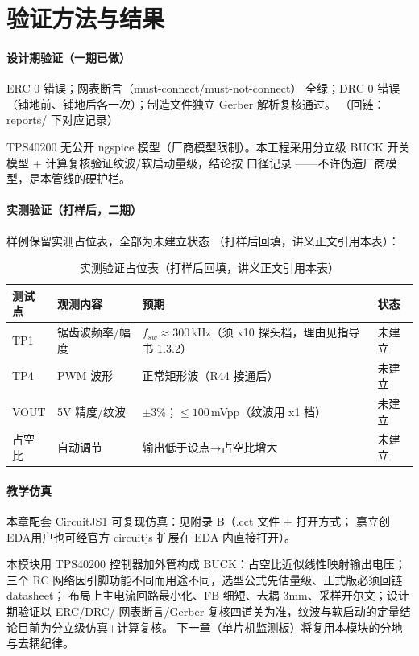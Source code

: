 \section{验证方法与结果}

\paragraph{设计期验证（一期已做）} ERC 0 错误；网表断言（must-connect/must-not-connect）
全绿；DRC 0 错误（铺地前、铺地后各一次）；制造文件独立 Gerber 解析复核通过。
（回链：reports/ 下对应记录）

\begin{note}
TPS40200 无公开 ngspice 模型（厂商模型限制）。本工程采用分立级 BUCK 开关模型 +
计算复核验证纹波/软启动量级，结论按  口径记录
——不许伪造厂商模型，是本管线的硬护栏。
\end{note}

\paragraph{实测验证（打样后，二期）} 样例保留实测占位表，全部为未建立状态
（打样后回填，讲义正文引用本表）：
\begin{table}[h]
  \centering
  \small
  \begin{tabular}{@{}llll@{}}
    \toprule
    测试点 & 观测内容 & 预期 & 状态 \\
    \midrule
    TP1 & 锯齿波频率/幅度 & $f_{sw}\approx300\,$kHz（须 x10 探头档，理由见指导书 1.3.2） & 未建立 \\
    TP4 & PWM 波形 & 正常矩形波（R44 接通后） & 未建立 \\
    VOUT & 5V 精度/纹波 & $\pm 3\%$；$\le 100\,$mVpp（纹波用 x1 档） & 未建立 \\
    占空比 & 自动调节 & 输出低于设点→占空比增大 & 未建立 \\
    \bottomrule
  \end{tabular}
  \caption{实测验证占位表（打样后回填，讲义正文引用本表）}
\end{table}

\paragraph{教学仿真} 本章配套 CircuitJS1 可复现仿真：见附录 B（.cct 文件 + 打开方式；
嘉立创EDA用户也可经官方 circuitjs 扩展在 EDA 内直接打开）。

\begin{conclusion}
本模块用 TPS40200 控制器加外管构成 BUCK：占空比近似线性映射输出电压；
三个 RC 网络因引脚功能不同而用途不同，选型公式先估量级、正式版必须回链 datasheet；
布局上主电流回路最小化、FB 细短、去耦 3mm、采样开尔文；设计期验证以 ERC/DRC/
网表断言/Gerber 复核四道关为准，纹波与软启动的定量结论目前为分立级仿真+计算复核。
下一章（单片机监测板）将复用本模块的分地与去耦纪律。
\end{conclusion}
